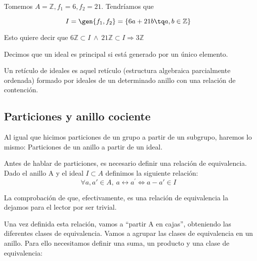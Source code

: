 \documentclass[nochap]{apuntes}
\begin{document}
\begin{example} Tomemos $A = \mathbb{Z}, f_1=6, f_2=21$. Tendríamos que

\[ I=\gen{f_1,f_2}=\{6a+21b \tq a,b\in \mathbb{Z}\} \]

Esto quiere decir que $6\mathbb{Z}\subset I \ \wedge \ 21\mathbb{Z}\subset I \Rightarrow 3\mathbb{Z}$
\end{example}
\begin{defn}\label{defPrincipal}
 Decimos que un ideal es principal si está generado por un único elemento.
\end{defn}

\begin{defn}
Un retículo de ideales es aquel retículo (estructura algebraica parcialmente ordenada) formado por ideales de un determinado anillo
con una relación de contención.
\end{defn}

\subsection{Particiones y anillo cociente}

Al igual que hicimos particiones de un grupo a partir de un subgrupo, haremos lo mismo: Particiones de un anillo a partir de un ideal.

Antes de hablar de particiones, es necesario definir una relación de equivalencia. Dado el anillo A y el ideal $I \subset A$ definimos la siguiente relación:
\[\forall a, a' \in A, \ a\rel a^{'} \Leftrightarrow a - a' \in I \]

La comprobación de que, efectivamente, es una relación de equivalencia la dejamos para el lector por ser trivial.

Una vez definida esta relación, vamos a ``partir A en cajas'', obteniendo las diferentes clases de equivalencia. Vamos a agrupar las clases de equivalencia en un anillo. Para ello necesitamos definir una suma, un producto y una clase de equivalencia:
\end{document}
